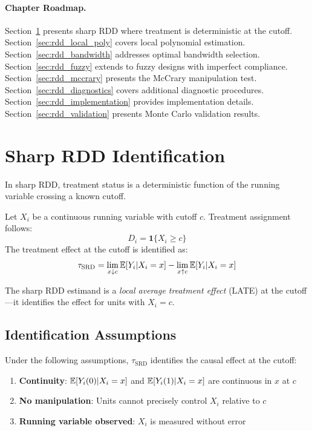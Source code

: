 \paragraph{Chapter Roadmap.}
Section~\ref{sec:rdd_sharp} presents sharp RDD where treatment is deterministic at the cutoff. Section~\ref{sec:rdd_local_poly} covers local polynomial estimation. Section~\ref{sec:rdd_bandwidth} addresses optimal bandwidth selection. Section~\ref{sec:rdd_fuzzy} extends to fuzzy designs with imperfect compliance. Section~\ref{sec:rdd_mccrary} presents the McCrary manipulation test. Section~\ref{sec:rdd_diagnostics} covers additional diagnostic procedures. Section~\ref{sec:rdd_implementation} provides implementation details. Section~\ref{sec:rdd_validation} presents Monte Carlo validation results.

\section{Sharp RDD Identification}
\label{sec:rdd_sharp}

In sharp RDD, treatment status is a deterministic function of the running variable crossing a known cutoff.

\begin{definition}
\label{def:sharp_rdd}
Let $X_i$ be a continuous running variable with cutoff $c$. Treatment assignment follows:
\begin{equation}
    D_i = \mathbf{1}\{X_i \geq c\}
\end{equation}
The treatment effect at the cutoff is identified as:
\begin{equation}
    \tau_{\text{SRD}} = \lim_{x \downarrow c} \mathbb{E}[Y_i | X_i = x] - \lim_{x \uparrow c} \mathbb{E}[Y_i | X_i = x]
    \label{eq:rdd_sharp_tau}
\end{equation}
\end{definition}

The sharp RDD estimand is a \emph{local average treatment effect} (LATE) at the cutoff---it identifies the effect for units with $X_i = c$.

\subsection{Identification Assumptions}

\begin{theorem}
\label{thm:sharp_rdd_id}
Under the following assumptions, $\tau_{\text{SRD}}$ identifies the causal effect at the cutoff:
\begin{enumerate}
    \item \textbf{Continuity}: $\mathbb{E}[Y_i(0) | X_i = x]$ and $\mathbb{E}[Y_i(1) | X_i = x]$ are continuous in $x$ at $c$
    \item \textbf{No manipulation}: Units cannot precisely control $X_i$ relative to $c$
    \item \textbf{Running variable observed}: $X_i$ is measured without error
\end{enumerate}
\end{theorem}

